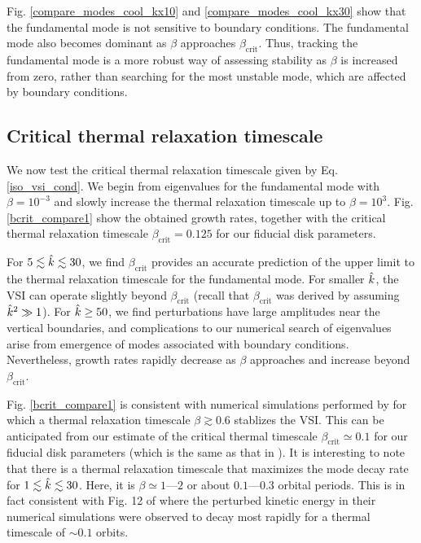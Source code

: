 Fig. \ref{compare_modes_cool_kx10} and \ref{compare_modes_cool_kx30} 
show that the fundamental mode is not sensitive to boundary
conditions. The fundamental mode also becomes dominant as $\beta$
approaches $\beta_\mathrm{crit}$.  
Thus, tracking the fundamental mode is a more robust way of 
assessing stability as $\beta$ is increased from zero, rather than
searching for the most unstable mode, which are affected by boundary 
conditions.  

\subsection{Critical thermal relaxation
  timescale}\label{bcrit_num_test}
We now test the critical thermal relaxation timescale given by
Eq. \ref{iso_vsi_cond}. We begin from eigenvalues for the fundamental
mode with $\beta=10^{-3}$ and slowly increase the thermal
relaxation timescale up to $\beta=10^3$. Fig. \ref{bcrit_compare1}
show the obtained growth rates, together with the critical  
thermal relaxation timescale $\beta_\mathrm{crit}=0.125$ for our
fiducial disk parameters.   

For $5\lesssim\hat{k}\lesssim30$, we find $\beta_\mathrm{crit}$ provides
an accurate prediction of the upper limit to the thermal relaxation 
timescale for the fundamental mode. For smaller $\hat{k}$, the VSI can
operate slightly beyond $\beta_\mathrm{crit}$ (recall that
$\beta_\mathrm{crit}$ was derived by assuming $\hat{k}^2\gg 1$). For
$\hat{k}\geq 50$, we find perturbations have large amplitudes near the
vertical boundaries, and complications to our numerical search of
eigenvalues arise from emergence of modes associated with boundary
conditions. Nevertheless, growth rates rapidly decrease as $\beta$
approaches and increase beyond $\beta_\mathrm{crit}$.  

Fig. \ref{bcrit_compare1} is consistent with numerical simulations
performed by \cite{nelson13} for which a thermal relaxation timescale
$\beta\gtrsim 0.6$ stablizes the VSI. This can be anticipated from our
estimate of the critical thermal timescale $\beta_\mathrm{crit}\simeq
0.1$ for our fiducial disk parameters (which is the same as that in
\citeauthor{nelson13}). It is interesting to note that there is a
thermal relaxation timescale that maximizes the mode decay rate for
$1\lesssim \hat{k} \lesssim 30$. Here, it is $\beta\simeq1$---$2$ or
about $0.1$---$0.3$ orbital periods. This is in fact consistent with 
Fig. 12 of \citeauthor{nelson13} where the perturbed kinetic energy in their
numerical simulations were observed to decay most rapidly for a
thermal timescale of $\sim 0.1$ orbits.     


